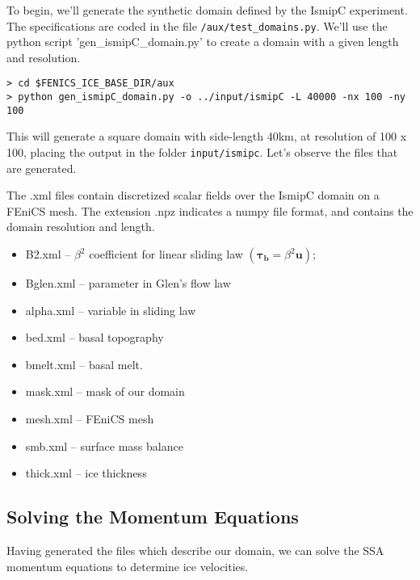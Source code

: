 \documentclass[11pt, reqno, nocenter]{article}
\begin{document}
To begin, we'll generate the synthetic domain defined by the IsmipC experiment. The specifications are coded in the file {\tt /aux/test\_domains.py}. We'll use the python script 'gen\_ismipC\_domain.py' to create a domain with a given length and resolution.

\begin{verbatim}
> cd $FENICS_ICE_BASE_DIR/aux 
> python gen_ismipC_domain.py -o ../input/ismipC -L 40000 -nx 100 -ny 100 
\end{verbatim}

This will generate a square domain with side-length 40\si{\kilo\metre}, at resolution of 100 x 100, placing the output in the folder {\tt input/ismipc}.
Let's observe the files that are generated.


The .xml files contain discretized scalar fields over the IsmipC domain on a FEniCS mesh. The extension .npz indicates a numpy file format, and contains the domain resolution and length.

\begin{itemize}
\item B2.xml -- $\beta^2$ coefficient for linear sliding law $( = \beta^2 )$;
\item  Bglen.xml -- parameter in Glen's flow law
\item alpha.xml -- variable in sliding law 
\item bed.xml -- basal topography
\item bmelt.xml -- basal melt. 
\item mask.xml -- mask of our domain
\item mesh.xml -- FEniCS mesh
\item smb.xml -- surface mass balance
\item thick.xml -- ice thickness

\end{itemize}

\subsection{Solving the Momentum Equations}

Having generated the files which describe our domain, we can solve the SSA momentum equations to determine ice velocities. 
\end{document}
